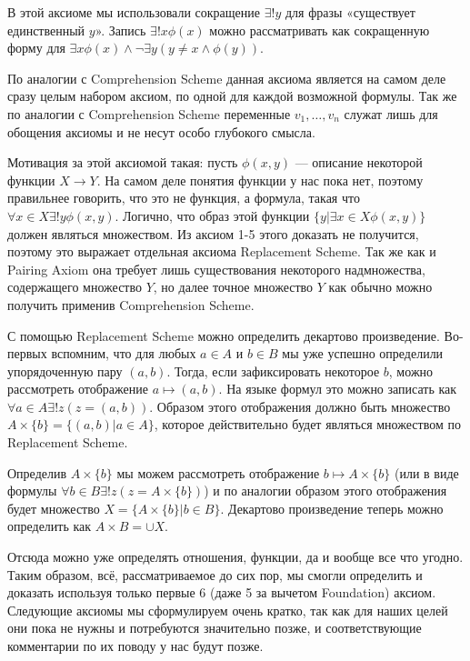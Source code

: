 В этой аксиоме мы использовали сокращение $\exists!y$ для фразы «существует единственный $y$». Запись $\exists!x\phi(x)$ можно рассматривать как сокращенную форму для $\exists x \phi(x) \wedge \neg \exists y (y\not=x \wedge \phi(y))$.

По аналогии с Comprehension Scheme данная аксиома является на самом деле сразу целым набором аксиом, по одной для каждой возможной формулы. Так же по аналогии с Comprehension Scheme переменные $v_1, \ldots, v_n$ служат лишь для обощения аксиомы и не несут особо глубокого смысла.

Мотивация за этой аксиомой такая: пусть $\phi(x, y)$ — описание некоторой функции $X\to Y$. На самом деле понятия функции у нас пока нет, поэтому правильнее говорить, что это не функция, а формула, такая что $\forall x\in X \exists!y \phi(x, y)$. Логично, что образ этой функции $\{y|\exists x \in X \phi(x, y)\}$ должен являться множеством. Из аксиом 1-5 этого доказать не получится, поэтому это выражает отдельная аксиома Replacement Scheme. Так же как и Pairing Axiom она требует лишь существования некоторого надмножества, содержащего множество $Y$, но далее точное множество $Y$ как обычно можно получить применив Comprehension Scheme.

С помощью Replacement Scheme можно определить декартово произведение. Во-первых вспомним, что для любых $a\in A$ и $b\in B$ мы уже успешно определили упорядоченную пару $(a, b)$. Тогда, если зафиксировать некоторое $b$, можно рассмотреть отображение $a \mapsto (a, b)$. На языке формул это можно записать как $\forall a\in A \exists!z (z = (a, b))$. Образом этого отображения должно быть множество $A\times\{b\} = \{(a, b)| a\in A\}$, которое действительно будет являться множеством по Replacement Scheme.

Определив $A\times\{b\}$ мы можем рассмотреть отображение $b\mapsto A \times \{b\}$ (или в виде формулы $\forall b\in B \exists! z (z = A\times\{b\})$) и по аналогии образом этого отображения будет множество $X = \{A\times \{ b \} | b \in B\}$. Декартово произведение теперь можно определить как $A\times B = \cup X$.

Отсюда можно уже определять отношения, функции, да и вообще все что угодно. Таким образом, всё, рассматриваемое до сих пор, мы смогли определить и доказать используя только первые 6 (даже 5 за вычетом Foundation) аксиом. Следующие аксиомы мы сформулируем очень кратко, так как для наших целей они пока не нужны и потребуются значительно позже, и соответствующие комментарии по их поводу у нас будут позже.

